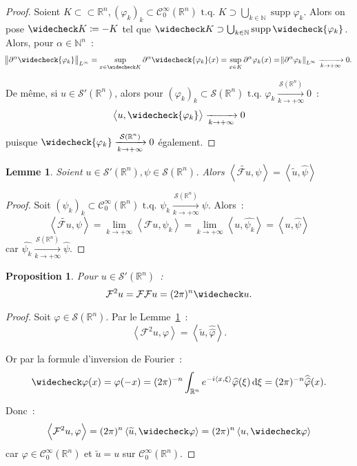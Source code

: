 \documentclass{report}
\DeclareMathOperator{\supp}{supp}
\newcommand{\R}{{\mathbb R}}
\newcommand{\N}{{\mathbb N}}
\newcommand{\scpr}[2]{\left\langle#1, #2\right\rangle}
\newcommand{\tq}{\text{ t.q. }}
\newcommand{\st}{\tq}
\newcommand{\pinfty}{{+\infty}}
\newtheorem{prp}[thm]{Proposition}
\newtheorem{lem}[thm]{Lemme}
\theoremstyle{definition}
\theoremstyle{remark}
\begin{document}
\begin{proof} Soient $K \subset\subset \R^n, (\varphi_k)_k \subset \mathcal C^\infty_0(\R^n) \st K \supset \bigcup_{k \in \N}\supp\varphi_k$. Alors on pose
$\widecheck K \coloneqq -K$ tel que $\widecheck K \supset \bigcup_{k \in \N}\supp\widecheck {\varphi_k}$. Alors, pour $\alpha \in \N^n$~:
\[\norm {\partial^\alpha\widecheck{\varphi_k}}_{L^\infty} = \sup_{x \in \widecheck K}\partial^\alpha\widecheck {\varphi_k}(x) = \sup_{x \in K}\partial^\alpha\varphi_k(x)
= \norm {\partial^\alpha\varphi_k}_{L^\infty} \xrightarrow[k \to \pinfty]{} 0.\]

De même, si $u \in \mathcal S'(\R^n)$, alors pour $(\varphi_k)_k \subset \mathcal S(\R^n) \st \varphi_k \xrightarrow[k \to \pinfty]{\mathcal S(\R^n)} 0$~:
\[\scpr u{\widecheck {\varphi_k}} \xrightarrow[k \to \pinfty]{} 0\]
puisque $\widecheck {\varphi_k} \xrightarrow[k \to \pinfty]{\mathcal S(\R^n)} 0$ également.
\end{proof}

\begin{lem}\label{lem:Fourier distribution prolongée} Soient $u \in \mathcal S'(\R^n), \psi \in \mathcal S(\R^n)$.
Alors $\scpr {\widetilde {\mathcal Fu}}\psi = \scpr {\widetilde u}{\widehat \psi}$
\end{lem}

\begin{proof} Soit $(\psi_k)_k \subset \mathcal C^\infty_0(\R^n) \st \psi_k \xrightarrow[k \to \pinfty]{\mathcal S(\R^n)} \psi$. Alors~:
\[\scpr {\widetilde {\mathcal Fu}}\psi = \lim_{k \to \pinfty}\scpr {\mathcal Fu}{\psi_k} = \lim_{k \to \pinfty}\scpr u{\widehat {\psi_k}} = \scpr u{\widehat \psi}\]
car $\widehat {\psi_k} \xrightarrow[k \to \pinfty]{\mathcal S(\R^n)} \widehat \psi$.
\end{proof}

\begin{prp} Pour $u \in \mathcal S'(\R^n)$~:
\[\mathcal F^2u = \mathcal F\mathcal Fu = (2\pi)^n\widecheck u.\]
\end{prp}

\begin{proof} Soit $\varphi \in \mathcal S(\R^n)$. Par le Lemme~\ref{lem:Fourier distribution prolongée}~:
\[\scpr {\mathcal F^2u}\varphi = \scpr {\widetilde u}{\widehat {\widehat \varphi}}.\]

Or par la formule d'inversion de Fourier~:
\[\widecheck \varphi(x) = \varphi(-x) = (2\pi)^{-n}\int_{\R^n}e^{-i\scpr x\xi}\widehat \varphi(\xi)\dif \xi = (2\pi)^{-n}\widehat {\widehat \varphi}(x).\]

Donc~:
\[\scpr {\mathcal F^2u}\varphi = (2\pi)^n\scpr {\widetilde u}{\widecheck \varphi} = (2\pi)^n\scpr u{\widecheck \varphi}\]
car $\varphi \in \mathcal C^\infty_0(\R^n)$ et $\widetilde u = u$ sur $\mathcal C^\infty_0(\R^n)$.
\end{proof}
\end{document}
